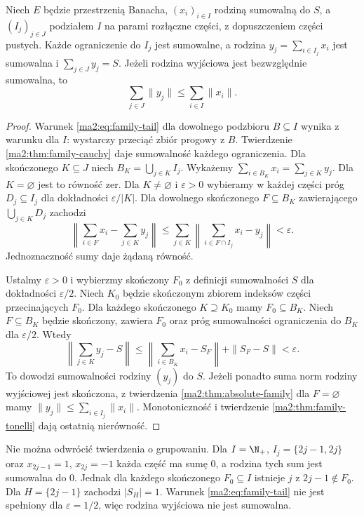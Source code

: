 \begin{twierdzenie}
\label{ma2:thm:family-grouping}
Niech $E$ będzie przestrzenią Banacha, $(x_i)_{i\in I}$
rodziną sumowalną do $S$, a $(I_j)_{j\in J}$
podziałem $I$ na parami rozłączne części, z dopuszczeniem
części pustych. Każde ograniczenie do $I_j$ jest
sumowalne, a rodzina $y_j=\sum_{i\in I_j}x_i$
jest sumowalna i $\sum_{j\in J}y_j=S$.
Jeżeli rodzina wyjściowa jest bezwzględnie sumowalna,
to
\[
 \sum_{j\in J}\|y_j\|\le\sum_{i\in I}\|x_i\|.
\]
\end{twierdzenie}
\begin{proof}
Warunek \eqref{ma2:eq:family-tail} dla dowolnego
podzbioru $B\subseteq I$ wynika z warunku dla $I$:
wystarczy przeciąć zbiór progowy z $B$. Twierdzenie
\ref{ma2:thm:family-cauchy} daje sumowalność
każdego ograniczenia. Dla skończonego $K\subseteq J$
niech $B_K=\bigcup_{j\in K}I_j$.
Wykażemy $\sum_{i\in B_K}x_i=\sum_{j\in K}y_j$.
Dla $K=\varnothing$ jest to równość zer.
Dla $K\ne\varnothing$ i $\varepsilon>0$ wybieramy
w każdej części próg $D_j\subseteq I_j$ dla
dokładności $\varepsilon/|K|$. Dla dowolnego
skończonego $F\subseteq B_K$ zawierającego
$\bigcup_{j\in K}D_j$ zachodzi
\[
 \left\|\sum_{i\in F}x_i-\sum_{j\in K}y_j\right\|
 \le \sum_{j\in K}\left\|\sum_{i\in F\cap I_j}x_i-y_j\right\|
 <\varepsilon.
\]
Jednoznaczność sumy daje żądaną równość.

Ustalmy $\varepsilon>0$ i wybierzmy skończony $F_0$
z definicji sumowalności $S$ dla dokładności
$\varepsilon/2$. Niech $K_0$ będzie skończonym zbiorem
indeksów części przecinających $F_0$. Dla każdego
skończonego $K\supseteq K_0$ mamy $F_0\subseteq B_K$.
Niech $F\subseteq B_K$ będzie skończony, zawiera $F_0$
oraz próg sumowalności ograniczenia do $B_K$ dla
$\varepsilon/2$. Wtedy
\[
 \left\|\sum_{j\in K}y_j-S\right\|
 \le \left\|\sum_{i\in B_K}x_i-S_F\right\|+\|S_F-S\|
 <\varepsilon.
\]
To dowodzi sumowalności rodziny $(y_j)$ do $S$.
Jeżeli ponadto suma norm rodziny wyjściowej jest
skończona, z twierdzenia \ref{ma2:thm:absolute-family}
dla $F=\varnothing$ mamy
$\|y_j\|\le\sum_{i\in I_j}\|x_i\|$.
Monotoniczność i twierdzenie \ref{ma2:thm:family-tonelli}
dają ostatnią nierówność.
\end{proof}

\begin{uwaga}
Nie można odwrócić twierdzenia o grupowaniu.
Dla $I=\N_+$, $I_j=\{2j-1,2j\}$ oraz
$x_{2j-1}=1$, $x_{2j}=-1$ każda część ma sumę $0$,
a rodzina tych sum jest sumowalna do $0$.
Jednak dla każdego skończonego $F_0\subseteq I$
istnieje $j$ z $2j-1\notin F_0$. Dla
$H=\{2j-1\}$ zachodzi $|S_H|=1$.
Warunek \eqref{ma2:eq:family-tail} nie jest spełniony
dla $\varepsilon=1/2$, więc rodzina wyjściowa nie
jest sumowalna.
\end{uwaga}

